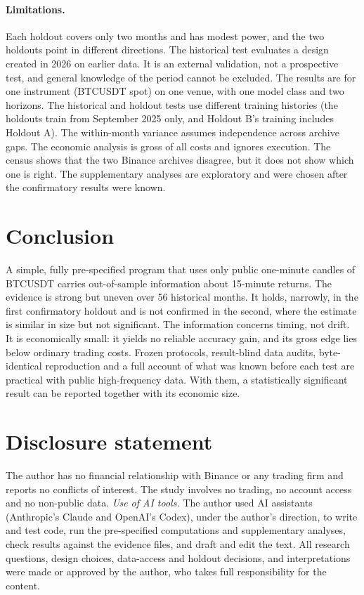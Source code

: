 \documentclass[11pt]{article}
\begin{document}
\paragraph{Limitations.} Each holdout covers only two months and has modest power, and the two holdouts point in different directions. The historical test evaluates a design created in 2026 on earlier data. It is an external validation, not a prospective test, and general knowledge of the period cannot be excluded. The results are for one instrument (BTCUSDT spot) on one venue, with one model class and two horizons. The historical and holdout tests use different training histories (the holdouts train from September 2025 only, and Holdout B's training includes Holdout A). The within-month variance assumes independence across archive gaps. The economic analysis is gross of all costs and ignores execution. The census shows that the two Binance archives disagree, but it does not show which one is right. The supplementary analyses are exploratory and were chosen after the confirmatory results were known.

\section{Conclusion}

A simple, fully pre-specified program that uses only public one-minute candles of BTCUSDT carries out-of-sample information about 15-minute returns. The evidence is strong but uneven over 56 historical months. It holds, narrowly, in the first confirmatory holdout and is not confirmed in the second, where the estimate is similar in size but not significant. The information concerns timing, not drift. It is economically small: it yields no reliable accuracy gain, and its gross edge lies below ordinary trading costs. Frozen protocols, result-blind data audits, byte-identical reproduction and a full account of what was known before each test are practical with public high-frequency data. With them, a statistically significant result can be reported together with its economic size.

\section*{Disclosure statement}
The author has no financial relationship with Binance or any trading firm and reports no conflicts of interest. The study involves no trading, no account access and no non-public data. \emph{Use of AI tools.} The author used AI assistants (Anthropic's Claude and OpenAI's Codex), under the author's direction, to write and test code, run the pre-specified computations and supplementary analyses, check results against the evidence files, and draft and edit the text. All research questions, design choices, data-access and holdout decisions, and interpretations were made or approved by the author, who takes full responsibility for the content.
\end{document}

